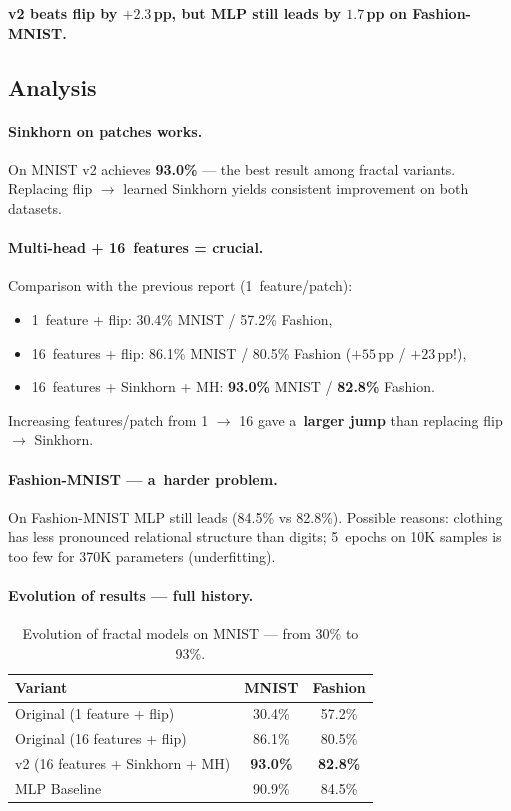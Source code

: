 \documentclass[11pt,a4paper]{report}
\begin{document}
\textbf{v2 beats flip by $+2.3$\,pp, but MLP still leads by $1.7$\,pp on Fashion-MNIST.}

\subsection{Analysis}

\paragraph{Sinkhorn on patches works.}
On MNIST v2 achieves \textbf{93.0\%} --- the best result among fractal variants.
Replacing flip $\to$ learned Sinkhorn yields consistent improvement on both datasets.

\paragraph{Multi-head + 16~features = crucial.}
Comparison with the previous report (1~feature/patch):
\begin{itemize}
\item 1~feature + flip: 30.4\% MNIST / 57.2\% Fashion,
\item 16~features + flip: 86.1\% MNIST / 80.5\% Fashion ($+55$\,pp / $+23$\,pp!),
\item 16~features + Sinkhorn + MH: \textbf{93.0\%} MNIST / \textbf{82.8\%} Fashion.
\end{itemize}
Increasing features/patch from 1 $\to$ 16 gave a~\textbf{larger jump} than replacing flip $\to$ Sinkhorn.

\paragraph{Fashion-MNIST --- a~harder problem.}
On Fashion-MNIST MLP still leads (84.5\% vs 82.8\%). Possible reasons: clothing has
less pronounced relational structure than digits; 5~epochs on 10K samples is too few for 370K
parameters (underfitting).

\paragraph{Evolution of results --- full history.}

\begin{table}[h]
\centering
\caption{Evolution of fractal models on MNIST --- from 30\% to 93\%.}
\begin{tabular}{lcc}
\hline
\textbf{Variant} & \textbf{MNIST} & \textbf{Fashion} \\
\hline
Original (1 feature + flip)             & 30.4\% & 57.2\% \\
Original (16 features + flip)             & 86.1\% & 80.5\% \\
v2 (16 features + Sinkhorn + MH)          & \textbf{93.0\%} & \textbf{82.8\%} \\
MLP Baseline                          & 90.9\% & 84.5\% \\
\hline
\end{tabular}
\end{table}
\end{document}
